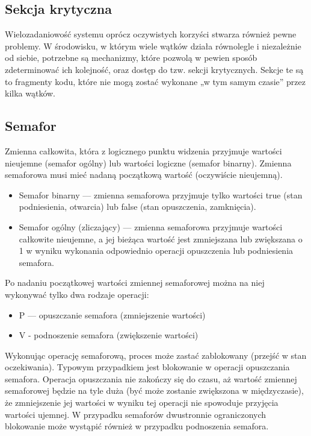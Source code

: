 \documentclass[12pt]{article}
\begin{document}
\subsection{Sekcja krytyczna}
    Wielozadaniowość systemu oprócz oczywistych korzyści stwarza również pewne problemy. W środowisku, w którym wiele wątków działa równolegle i niezależnie od siebie, potrzebne są mechanizmy, które pozwolą w pewien sposób zdeterminować ich kolejność, oraz dostęp do tzw. sekcji krytycznych. Sekcje te są to fragmenty kodu, które nie mogą zostać wykonane „w tym samym czasie” przez kilka wątków.


    \subsection{Semafor}
    Zmienna całkowita, która z logicznego punktu widzenia przyjmuje wartości nieujemne (semafor ogólny) lub wartości logiczne (semafor binarny). Zmienna semaforowa musi mieć nadaną początkową wartość (oczywiście nieujemną).
    
    \begin{itemize}
    \item Semafor binarny — zmienna semaforowa przyjmuje tylko wartości true (stan podniesienia, otwarcia) lub false (stan opuszczenia, zamknięcia).
    \item Semafor ogólny (zliczający) — zmienna semaforowa przyjmuje wartości całkowite nieujemne, a jej bieżąca wartość jest zmniejszana lub zwiększana o 1 w wyniku wykonania odpowiednio operacji opuszczenia lub podniesienia semafora.
    \end{itemize}
    
    Po nadaniu początkowej wartości zmiennej semaforowej można na niej wykonywać tylko dwa rodzaje operacji:
    
    \begin{itemize}
    \item P — opuszczanie semafora (zmniejszenie wartości)
    \item V - podnoszenie semafora (zwiększenie wartości)
    \end{itemize}
    
    Wykonując operację semaforową, proces może zastać zablokowany (przejść w stan oczekiwania). Typowym przypadkiem jest blokowanie w operacji opuszczania semafora. Operacja opuszczania nie zakończy się do czasu, aż wartość zmiennej semaforowej będzie na tyle duża (być może zostanie zwiększona w międzyczasie), że zmniejszenie jej wartości w wyniku tej operacji nie spowoduje przyjęcia wartości ujemnej. W przypadku semaforów dwustronnie ograniczonych blokowanie może wystąpić również w przypadku podnoszenia semafora.
    
\end{document}

